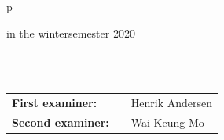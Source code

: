 \begin{center}
\begin{tabular}{p{\textwidth}}
\begin{center}
\large{in the wintersemester 2020}
\end{center}

\\

\\

\begin{center}
\begin{tabular}{lll}
\textbf{First examiner:} & & Henrik Andersen\\
\textbf{Second examiner:} & & Wai Keung Mo\\
\end{tabular}
\end{center}

\end{tabular}
\end{center}